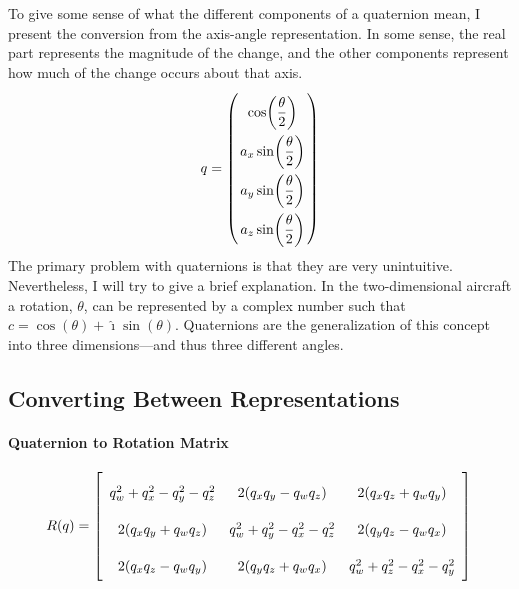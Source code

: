 \documentclass[letterpaper,10pt]{article}
\begin{document}
To give some sense of what the different components of a quaternion mean, I present the conversion from the axis-angle representation. In some sense, the real part represents the magnitude of the change, and the other components represent how much of the change occurs about that axis.
\begin{equation}
q = \left(\arraycolsep=1.4pt\def\arraystretch{2.2}\begin{array}{c} \cos\!\left(\dfrac{\theta}{2}\right) \\  a_x \sin\!\left(\dfrac{\theta}{2}\right) \\ a_y \sin\!\left(\dfrac{\theta}{2}\right) \\ a_z \sin\!\left(\dfrac{\theta}{2}\right) \end{array}\right)
\end{equation}
The primary problem with quaternions is that they are very unintuitive. Nevertheless, I will try to give a brief explanation. In the two-dimensional aircraft a rotation, $\theta$, can be represented by a complex number such that $c = \cos\!\left(\theta\right) + \hat{\imath} \sin\!\left(\theta\right)$. Quaternions are the generalization of this concept into three dimensions---and thus three different angles. 

\subsection{Converting Between Representations}

\paragraph{Quaternion to Rotation Matrix}
\begin{equation}
\label{eq:QtoMat}
R(q) = \left[ \begin{array}{c c c} q_w^2+q_x^2-q_y^2-q_z^2 & 2(q_x q_y - q_w q_z) & 2(q_x q_z + q_w q_y) \\ 2(q_x q_y+q_w q_z) & q_w^2+q_y^2-q_x^2-q_z^2 & 2(q_y q_z - q_w q_x) \\ 2(q_x q_z - q_w q_y) & 2(q_y q_z + q_w q_x) & q_w^2+q_z^2-q_x^2-q_y^2 \end{array} \right] \\
\end{equation}
\end{document}
